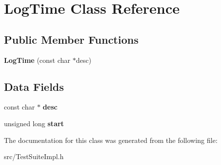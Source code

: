 \hypertarget{class_log_time}{}\section{Log\+Time Class Reference}
\label{class_log_time}
\subsection*{Public Member Functions}
\begin{DoxyCompactItemize}
\item 
\mbox{\label{class_log_time_a2d8958ddce1a60a31c7cdedf87fd9833}} 
{\bfseries Log\+Time} (const char $\ast$desc)
\end{DoxyCompactItemize}
\subsection*{Data Fields}
\begin{DoxyCompactItemize}
\item 
\mbox{\label{class_log_time_a7e3cc190bd7ae71a825e16f2bcf35eac}} 
const char $\ast$ {\bfseries desc}
\item 
\mbox{\label{class_log_time_ad053d200d3548bdc6710c4aec3f0d952}} 
unsigned long {\bfseries start}
\end{DoxyCompactItemize}


The documentation for this class was generated from the following file\+:\begin{DoxyCompactItemize}
\item 
src/Test\+Suite\+Impl.\+h\end{DoxyCompactItemize}
